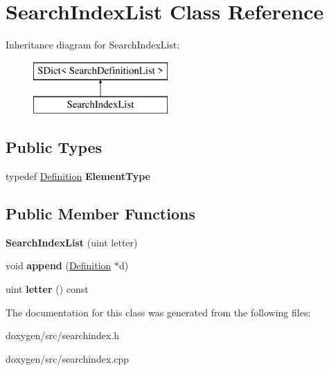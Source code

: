 \hypertarget{class_search_index_list}{}\section{Search\+Index\+List Class Reference}
\label{class_search_index_list}
Inheritance diagram for Search\+Index\+List\+:\begin{figure}[H]
\begin{center}
\leavevmode
\includegraphics[height=2.000000cm]{class_search_index_list}
\end{center}
\end{figure}
\subsection*{Public Types}
\begin{DoxyCompactItemize}
\item 
\mbox{\label{class_search_index_list_ab904fde1ec29986b9356cf264b4cebb0}} 
typedef \mbox{\hyperlink{class_definition}{Definition}} {\bfseries Element\+Type}
\end{DoxyCompactItemize}
\subsection*{Public Member Functions}
\begin{DoxyCompactItemize}
\item 
\mbox{\label{class_search_index_list_a801319ef8a3dfc96ca9291e0e1fb74bd}} 
{\bfseries Search\+Index\+List} (uint letter)
\item 
\mbox{\label{class_search_index_list_af22db636c52e9ba4ea18215b49037477}} 
void {\bfseries append} (\mbox{\hyperlink{class_definition}{Definition}} $\ast$d)
\item 
\mbox{\label{class_search_index_list_adb5e26dcc94ac74509721138ed0e09b7}} 
uint {\bfseries letter} () const
\end{DoxyCompactItemize}


The documentation for this class was generated from the following files\+:\begin{DoxyCompactItemize}
\item 
doxygen/src/searchindex.\+h\item 
doxygen/src/searchindex.\+cpp\end{DoxyCompactItemize}
